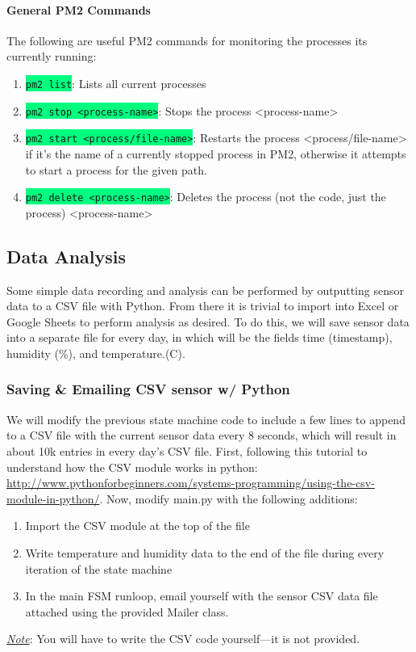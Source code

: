\documentclass{article}
\newcommand{\codei}[1]{\colorbox{SpringGreen}{\texttt{#1}}} %
\newcommand{\note}[1]{\underline{\textit{Note}}: #1}
\begin{document}
    \paragraph{General PM2 Commands}
    The following are useful PM2 commands for monitoring the processes its currently running:
    \begin{enumerate}
        \item \codei{pm2 list}: Lists all current processes
        \item \codei{pm2 stop <process-name>}: Stops the process <process-name>
        \item \codei{pm2 start <process/file-name>}: Restarts the process <process/file-name> if it's the name of a currently stopped process in PM2, otherwise it attempts to start a process for the given path.
        \item \codei{pm2 delete <process-name>}: Deletes the process (not the code, just the process) <process-name>
    \end{enumerate}


\subsection{Data Analysis}
Some simple data recording and analysis can be performed by outputting sensor data to a CSV file with Python. From there it is trivial to import into Excel or Google Sheets to perform analysis as desired. To do this, we will save sensor data into a separate file for every day, in which will be the fields time (timestamp), humidity (\%), and temperature.(\degree C).
  \subsubsection{Saving \& Emailing CSV sensor w/ Python}
  We will modify the previous state machine code to include a few lines to append to a CSV file with the current sensor data every 8 seconds, which will result in about 10k entries in every day's CSV file. First, following this tutorial to understand how the CSV module works in python:
  \href{http://www.pythonforbeginners.com/systems-programming/using-the-csv-module-in-python/}{http://www.pythonforbeginners.com/systems-programming/using-the-csv-module-in-python/}.
  Now, modify main.py with the following additions:
  \begin{enumerate}
      \item Import the CSV module at the top of the file
      \item Write temperature and humidity data to the end of the file during every iteration of the state machine
      \item In the main FSM runloop, email yourself with the sensor CSV data file attached using the provided Mailer class.
  \end{enumerate}
  \note{You will have to write the CSV code yourself—it is not provided.}
\end{document}
